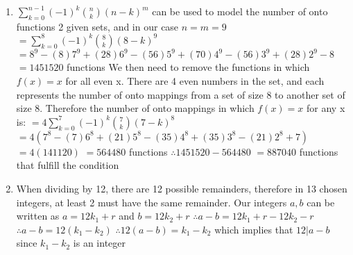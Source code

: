 \documentclass{article}
\begin{document}
\begin{enumerate}
		\item $\sum\limits_{k=0}^{n-1}(-1)^k{n\choose k}(n-k)^m$ can be used to model the number of onto functions 2 given sets, and in our case $n=m=9$
		\newline $=\sum\limits_{k=0}^{8}(-1)^k{8\choose k}(8-k)^9$
		\newline $=8^9-(8)7^9+(28)6^9-(56)5^9+(70)4^9-(56)3^9+(28)2^9-8$
		\newline $=1451520$ functions
		\newline We then need to remove the functions in which $f(x)=x$ for all even x.
		\newline There are 4 even numbers in the set, and each represents the number of onto mappings from a set of size 8 to another set of size 8.
		\newline Therefore the number of onto mappings in which $f(x)=x$ for any x is:
		\newline $=4\sum\limits_{k=0}^{7}(-1)^k{7\choose k}(7-k)^8$
		\newline $=4(7^8-(7)6^8+(21)5^8-(35)4^8+(35)3^8-(21)2^8+7)$
		\newline $=4(141120)$
		\newline $=564480$ functions
		\newline $\therefore 1451520-564480$
		\newline $=887040$ functions that fulfill the condition
		
		\item When dividing by 12, there are 12 possible remainders, therefore in 13 chosen integers, at least 2 must have the same remainder.
		\newline Our integers $a,b$ can be written as $a=12k_1 + r$ and $b=12k_2+r$
		\newline $\therefore a-b=12k_1+r-12k_2-r$
		\newline $\therefore a-b=12(k_1-k_2)$
		\newline $\therefore 12(a-b)=k_1-k_2$ which implies that $12|a-b$ since $k_1-k_2$ is an integer
		
	
	\end{enumerate}
\end{document}
